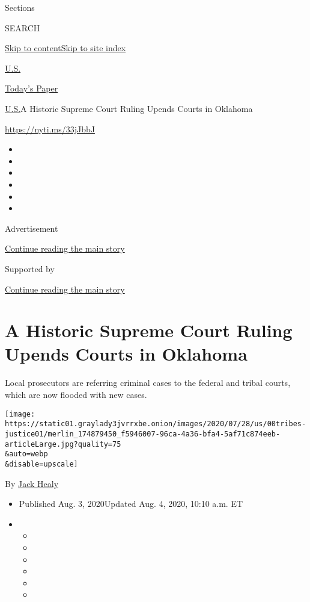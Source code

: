Sections

SEARCH

\protect\hyperlink{site-content}{Skip to
content}\protect\hyperlink{site-index}{Skip to site index}

\href{https://www.nytimes3xbfgragh.onion/section/us}{U.S.}

\href{https://myaccount.nytimes3xbfgragh.onion/auth/login?response_type=cookie\&client_id=vi}{}

\href{https://www.nytimes3xbfgragh.onion/section/todayspaper}{Today's
Paper}

\href{/section/us}{U.S.}\textbar{}A Historic Supreme Court Ruling Upends
Courts in Oklahoma

\url{https://nyti.ms/33jJbbJ}

\begin{itemize}
\item
\item
\item
\item
\item
\item
\end{itemize}

Advertisement

\protect\hyperlink{after-top}{Continue reading the main story}

Supported by

\protect\hyperlink{after-sponsor}{Continue reading the main story}

\hypertarget{a-historic-supreme-court-ruling-upends-courts-in-oklahoma}{%
\section{A Historic Supreme Court Ruling Upends Courts in
Oklahoma}\label{a-historic-supreme-court-ruling-upends-courts-in-oklahoma}}

Local prosecutors are referring criminal cases to the federal and tribal
courts, which are now flooded with new cases.

\texttt{[image: https://static01.graylady3jvrrxbe.onion/images/2020/07/28/us/00tribes-justice01/merlin\_174879450\_f5946007-96ca-4a36-bfa4-5af71c874eeb-articleLarge.jpg?quality=75\\\&auto=webp\\\&disable=upscale]}

By \href{https://www.nytimes3xbfgragh.onion/by/jack-healy}{Jack Healy}

\begin{itemize}
\item
  Published Aug. 3, 2020Updated Aug. 4, 2020, 10:10 a.m. ET
\item
  \begin{itemize}
  \item
  \item
  \item
  \item
  \item
  \item
  \end{itemize}
\end{itemize}

